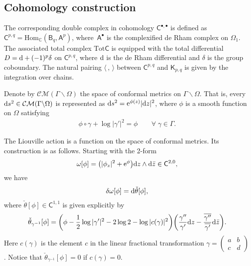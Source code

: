 \documentclass[pdftex]{sigma}%
\numberwithin{equation}{section}
\newcommand{\ov}{\overline}
\newcommand{\di}{\displaystyle}
\begin{document}
\subsection{Cohomology construction}%

The corresponding double complex in cohomology $\mathsf{C}^{\bullet, \bullet}$ is defined as $\mathsf{C}^{p, q}=\text{Hom}_{\mathbb{C}}\left(\mathsf{B}_q, \mathsf{A}^p\right)$, where~$\mathsf{A}^{\bullet}$ is the complexified de Rham complex on $\Omega_1$. The associated total complex $\text{Tot} \mathsf{C}$ is equipped with the total differential $D={\rm d}+(-1)^p\delta$ on $\mathsf{C}^{p, q}$, where ${\rm d}$ is the de Rham differential and $\delta$ is the group coboundary. The natural pairing $\langle \, , \, \rangle$ between $\mathsf{C}^{p, q}$ and $\mathsf{K}_{p, q}$ is given by the integration over chains.

Denote by $\mathcal{CM}(\Gamma\backslash \Omega )$ the space of conformal metrics on $\Gamma\backslash\Omega$. That is, every ${\rm d}s^2\in \mathcal{CM}(\Gamma\backslash \Omega)$ is represented as ${\rm d}s^2={\rm e}^{\phi(z)}|{\rm d}z|^2$, where $\phi$ is a smooth function on $\Omega$ satisfying
\begin{gather}\label{e:phi-behave}
\phi\circ\gamma+\log|\gamma'|^2=\phi\quad\quad\forall \;\gamma\in\Gamma.
\end{gather}

 The Liouville action is a function on the space of conformal metrics. Its construction is as follows.
Starting with the 2-form
\begin{gather*} %
\omega[\phi] = \big(|\phi_{z}|^2 +{\rm e}^{\phi}\big){\rm d}z\wedge {\rm d}\bar{z}\in \mathsf{C}^{2,0},
\end{gather*}
we have
\begin{gather*}
\delta\omega[\phi]={\rm d}\check{\theta}[\phi],
\end{gather*}
where $\check{\theta}[\phi] \in \mathsf{C}^{1,1}$ is given explicitly by
\begin{gather*} %
\check{\theta}_{\gamma^{-1}}[\phi]
= \bigg(\phi -\frac{1}{2}\log|\gamma'|^2-2\log 2-\log|c(\gamma)|^2\bigg)
\bigg(\frac{\gamma''}{\gamma'} {\rm d}z -\frac{\ov{\gamma''}}{\ov{\gamma'}}{\rm d}\bar{z}\bigg).
\end{gather*}
Here $c(\gamma)$ is the element $c$ in the linear fractional transformation $\di\gamma=\left(\begin{smallmatrix} a & b\\c & d\end{smallmatrix}\right)\!$. Notice that \mbox{$\check{\theta}_{\gamma^{-1}}[\phi]=0$} if $c(\gamma)=0$.
\end{document}
